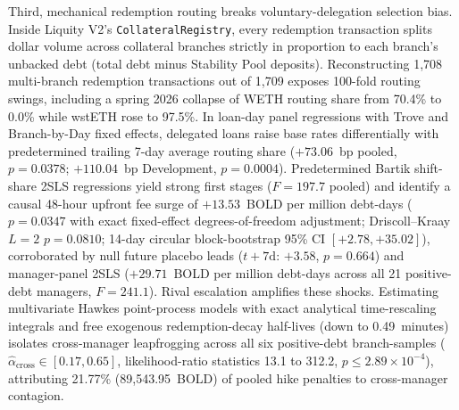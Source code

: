 Third, mechanical redemption routing breaks voluntary-delegation selection bias. Inside Liquity V2's \texttt{CollateralRegistry}, every redemption transaction splits dollar volume across collateral branches strictly in proportion to each branch's unbacked debt (total debt minus Stability Pool deposits). Reconstructing 1,708 multi-branch redemption transactions out of 1,709 exposes 100-fold routing swings, including a spring 2026 collapse of WETH routing share from 70.4\% to 0.0\% while wstETH rose to 97.5\%. In loan-day panel regressions with Trove and Branch-by-Day fixed effects, delegated loans raise base rates differentially with predetermined trailing 7-day average routing share ($+73.06$~bp pooled, $p = 0.0378$; $+110.04$~bp Development, $p = 0.0004$). Predetermined Bartik shift-share 2SLS regressions \citep{borusyak2022quasi} yield strong first stages ($F = 197.7$ pooled) and identify a causal 48-hour upfront fee surge of $+13.53$~BOLD per million debt-days ($p = 0.0347$ with exact fixed-effect degrees-of-freedom adjustment; Driscoll--Kraay $L=2$ $p = 0.0810$; 14-day circular block-bootstrap 95\% CI $[+2.78, +35.02]$), corroborated by null future placebo leads ($t+7\text{d}$: $+3.58$, $p = 0.664$) and manager-panel 2SLS ($+29.71$~BOLD per million debt-days across all 21 positive-debt managers, $F = 241.1$). Rival escalation amplifies these shocks. Estimating multivariate Hawkes point-process models \citep{hawkes1971spectra,ogata1988statistical} with exact analytical time-rescaling integrals and free exogenous redemption-decay half-lives (down to 0.49~minutes) isolates cross-manager leapfrogging across all six positive-debt branch-samples ($\hat{\alpha}_{\text{cross}} \in [0.17, 0.65]$, likelihood-ratio statistics 13.1 to 312.2, $p \le 2.89 \times 10^{-4}$), attributing 21.77\% (89,543.95~BOLD) of pooled hike penalties to cross-manager contagion.

